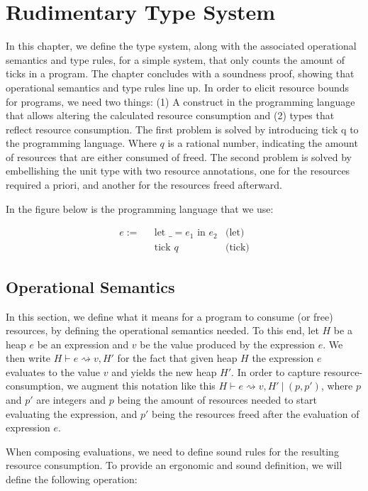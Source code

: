 \chapter{Rudimentary Type System}

In this chapter, we define the type system, along with the associated operational semantics and type rules, for a simple system, that only counts the amount of ticks in a program. The chapter concludes with a soundness proof, showing that operational semantics and type rules line up.
In order to elicit resource bounds for programs, we need two things: (1) A construct in the programming language that allows altering the calculated resource consumption and (2) types that reflect resource consumption. The first problem is solved by introducing \(\text{tick q}\) to the programming language. Where \(q\) is a rational number, indicating the amount of resources that are either consumed of freed. The second problem is solved by embellishing the unit type with two resource annotations, one for the resources required a priori, and another for the resources freed afterward.

In the figure below is the programming language that we use:

\begin{align*}
   e := ~~~ & \text{let } \_ = e_1 \text{ in } e_2   & \text{(let)}\\
            & \text{tick } q                       & \text{(tick)}
\end{align*}


\section{Operational Semantics}
In this section, we define what it means for a program to consume (or free) resources, by defining the operational semantics needed. To this end, let \(H\) be a heap \(e\) be an expression and \(v\) be the value produced by the expression \(e\). We then write \(H \vdash e \rightsquigarrow v, H'\) for the fact that given heap \(H\) the expression \(e\) evaluates to the value \(v\) and yields the new heap \(H'\). In order to capture resource-consumption, we augment this notation like this \(H \vdash e \rightsquigarrow v, H'~| ~(p, p')\), where \(p\) and \(p'\) are integers and \(p\) being the amount of resources needed to start evaluating the expression, and \(p'\) being the resources freed after the evaluation of expression \(e\).

When composing evaluations, we need to define sound rules for the resulting resource consumption. To provide an ergonomic and sound definition, we will define the following operation:

